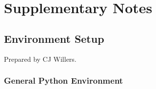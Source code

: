 
\part{Supplementary Notes}

\chapter{Environment Setup}
\label{sec:EnvironmentSetup}

Prepared by CJ Willers.

\section{General Python Environment}


